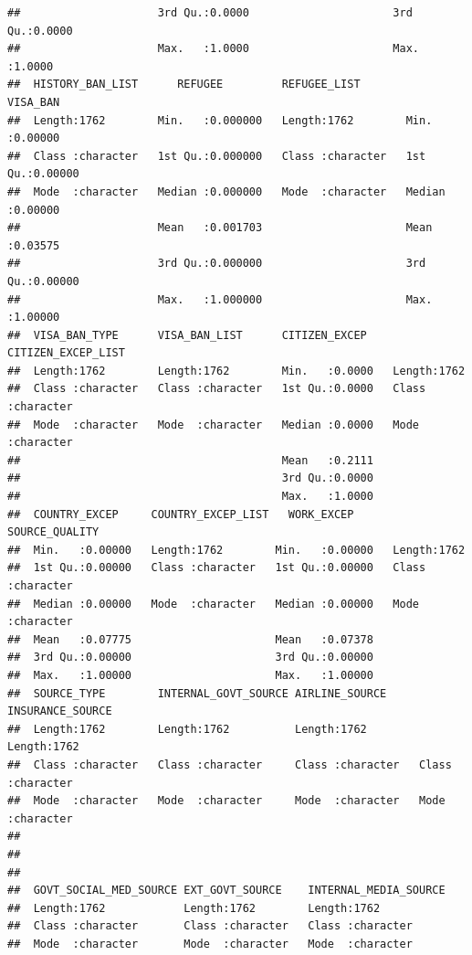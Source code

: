 \documentclass[]{article}
\begin{document}
\begin{verbatim}
##                     3rd Qu.:0.0000                      3rd Qu.:0.0000  
##                     Max.   :1.0000                      Max.   :1.0000  
##  HISTORY_BAN_LIST      REFUGEE         REFUGEE_LIST          VISA_BAN      
##  Length:1762        Min.   :0.000000   Length:1762        Min.   :0.00000  
##  Class :character   1st Qu.:0.000000   Class :character   1st Qu.:0.00000  
##  Mode  :character   Median :0.000000   Mode  :character   Median :0.00000  
##                     Mean   :0.001703                      Mean   :0.03575  
##                     3rd Qu.:0.000000                      3rd Qu.:0.00000  
##                     Max.   :1.000000                      Max.   :1.00000  
##  VISA_BAN_TYPE      VISA_BAN_LIST      CITIZEN_EXCEP    CITIZEN_EXCEP_LIST
##  Length:1762        Length:1762        Min.   :0.0000   Length:1762       
##  Class :character   Class :character   1st Qu.:0.0000   Class :character  
##  Mode  :character   Mode  :character   Median :0.0000   Mode  :character  
##                                        Mean   :0.2111                     
##                                        3rd Qu.:0.0000                     
##                                        Max.   :1.0000                     
##  COUNTRY_EXCEP     COUNTRY_EXCEP_LIST   WORK_EXCEP      SOURCE_QUALITY    
##  Min.   :0.00000   Length:1762        Min.   :0.00000   Length:1762       
##  1st Qu.:0.00000   Class :character   1st Qu.:0.00000   Class :character  
##  Median :0.00000   Mode  :character   Median :0.00000   Mode  :character  
##  Mean   :0.07775                      Mean   :0.07378                     
##  3rd Qu.:0.00000                      3rd Qu.:0.00000                     
##  Max.   :1.00000                      Max.   :1.00000                     
##  SOURCE_TYPE        INTERNAL_GOVT_SOURCE AIRLINE_SOURCE     INSURANCE_SOURCE  
##  Length:1762        Length:1762          Length:1762        Length:1762       
##  Class :character   Class :character     Class :character   Class :character  
##  Mode  :character   Mode  :character     Mode  :character   Mode  :character  
##                                                                               
##                                                                               
##                                                                               
##  GOVT_SOCIAL_MED_SOURCE EXT_GOVT_SOURCE    INTERNAL_MEDIA_SOURCE
##  Length:1762            Length:1762        Length:1762          
##  Class :character       Class :character   Class :character     
##  Mode  :character       Mode  :character   Mode  :character     

\end{verbatim}
\end{document}
